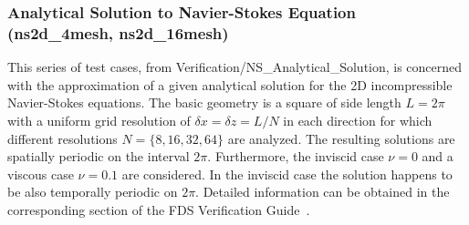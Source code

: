 \subsubsection{Analytical Solution to Navier-Stokes Equation ({\ct ns2d\_4mesh, ns2d\_16mesh})}

This series of test cases, from Verification/NS\_Analytical\_Solution, is concerned with the approximation of a given analytical solution for the 2D incompressible Navier-Stokes equations. 
%
The basic geometry is a square of side length $L=2\pi$ with a uniform grid resolution of $\delta x = \delta z = L/N$ in each direction for which different resolutions $N =\{8,16,32,64\}$ are analyzed.  The resulting solutions are spatially periodic on the interval $2\pi$. Furthermore, the inviscid case $\nu=0$ and a viscous case $\nu=0.1$ are considered. In the inviscid case the solution happens to be also temporally periodic on $2\pi$.
Detailed information can be obtained in the corresponding section of the FDS Verification Guide~\cite{McGrattan:2018:VG}.

